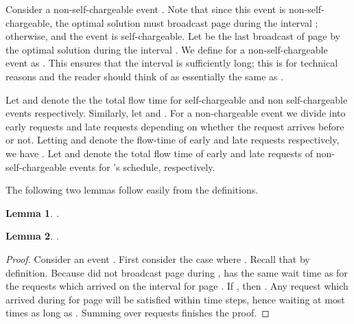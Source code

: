 \documentclass[11pt]{article}
\newtheorem{lemma}{Lemma}[section]
\begin{document}
\begin{titlepage}
Consider a non-self-chargeable event .  Note that since this
event is non-self-chargeable, the optimal solution must broadcast page
 during the interval ; otherwise,  and the event is self-chargeable.  Let  be the
last broadcast of page  by the optimal solution during the interval
. We define  for a
non-self-chargeable event  as . This ensures that the interval  is
sufficiently long; this is for technical reasons and the reader should
think of  as essentially the same as .

Let  and  denote the the total flow time for
self-chargeable and non self-chargeable events
respectively. Similarly, let  and .  For
a non-chargeable event  we divide  into early
requests and late requests depending on whether the request arrives
before  or not.  Letting  and  denote
the flow-time of early and late requests respectively, we have
. Let  and 
denote the total flow time of early and late requests of
non-self-chargeable events for 's schedule,
respectively.

The following two lemmas follow easily from the definitions.

\begin{lemma} \label{lem:SC} .
\vspace{-1mm}
\end{lemma}


\iffalse
\begin{proof}
  If , then for each request  satisfied
  at time , , where
   and  is the wait time of  in 
  and  respectively. Thus we have 
  by summing over all requests which arrive for page  on the
  interval  for an event . By summing
  over all self-chargeable events , the lemma
  follows. \end{proof}

Now we show that requests which are late for some non-self-chargeable
event can be bound similarly.

\fi

\begin{lemma}
\label{lem:NSCl}
 .
\end{lemma}
\iffalse
\begin{proof}
  Consider an event . First consider the case where . Recall that  by
  definition. Because  did not broadcast page  during
  ,  has the same wait time as  for
  the requests which arrived on the interval  for page . If , then
  . Any request which arrived during
   for page  will be satisfied within 
  time steps, hence waiting at most  times as long as
  . Summing over requests finishes the proof.
\end{proof}


\end{titlepage}
\end{document}
